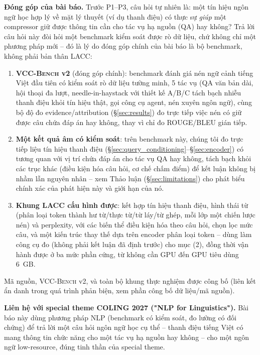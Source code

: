 \documentclass[12pt,a4paper]{article}
\newcommand{\method}[1]{\textsc{#1}}         %
\begin{document}
\textbf{Đóng góp của bài báo.} Trước P1--P3, câu hỏi tự nhiên là: một tín hiệu ngôn ngữ học hợp lý về mặt lý thuyết (ví dụ thanh điệu) có thực sự \textit{giúp} một compressor giữ được thông tin cần cho tác vụ hạ nguồn (QA) hay không? Trả lời câu hỏi này đòi hỏi một benchmark kiểm soát được rò dữ liệu, chứ không chỉ một phương pháp mới -- đó là lý do đóng góp chính của bài báo là bộ benchmark, không phải bản thân \method{LACC}:

\begin{enumerate}[label=(\arabic*),leftmargin=*]
    \item \textbf{\method{VCC-Bench} v2} (đóng góp chính): benchmark đánh giá nén ngữ cảnh tiếng Việt đầu tiên có kiểm soát rò dữ liệu tường minh, 5 tác vụ (QA văn bản dài, hội thoại đa lượt, needle-in-haystack với thiết kế A/B/C tách bạch nhiễu thanh điệu khỏi tín hiệu thật, gọi công cụ agent, nén xuyên ngôn ngữ), cùng bộ độ đo evidence/attribution (\S\ref{sec:results}) đo trực tiếp việc nén có giữ được câu chứa đáp án hay không, thay vì chỉ đo ROUGE/BLEU gián tiếp.
    \item \textbf{Một kết quả âm có kiểm soát}: trên benchmark này, chúng tôi đo trực tiếp liệu tín hiệu thanh điệu (\S\ref{sec:query_conditioning}--\S\ref{sec:encoder}) có tương quan với vị trí chứa đáp án cho tác vụ QA hay không, tách bạch khỏi các trục khác (điều kiện hóa câu hỏi, cơ chế chấm điểm) để kết luận không bị nhầm lẫn nguyên nhân -- xem Thảo luận (\S\ref{sec:limitations}) cho phát biểu chính xác của phát hiện này và giới hạn của nó.
    \item \textbf{Khung \method{LACC} cấu hình được}: kết hợp tín hiệu thanh điệu, hình thái từ (phân loại token thành hư từ/thực từ/từ láy/từ ghép, mỗi lớp một chiến lược nén) và perplexity, với các biến thể điều kiện hóa theo câu hỏi, chọn lọc mức câu, và một kiến trúc thay thế dựa trên encoder phân loại token -- dùng làm công cụ đo (không phải kết luận đã định trước) cho mục (2), đồng thời vận hành được ở ba mức phần cứng, từ không cần GPU đến GPU tiêu dùng 6~GB.
\end{enumerate}

Mã nguồn, \method{VCC-Bench} v2, và toàn bộ khung thực nghiệm được công bố (liên kết ẩn danh trong quá trình phản biện, xem phần công bố dữ liệu/mã nguồn).

\textbf{Liên hệ với special theme COLING 2027 ("NLP for Linguistics").} Bài báo này dùng phương pháp NLP (benchmark có kiểm soát, đo lường có đối chứng) để trả lời một câu hỏi ngôn ngữ học cụ thể -- thanh điệu tiếng Việt có mang thông tin chức năng cho một tác vụ hạ nguồn hay không -- cho một ngôn ngữ low-resource, đúng tinh thần của special theme.
\end{document}
